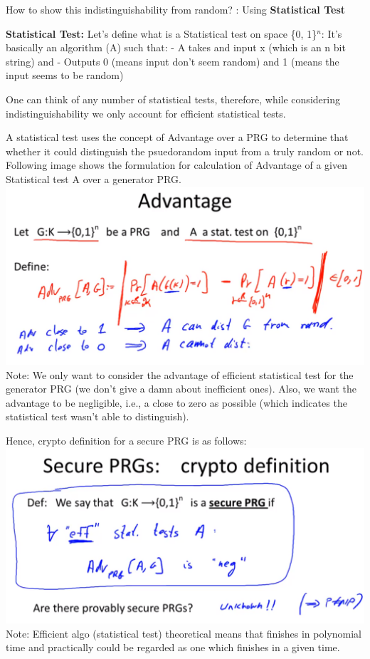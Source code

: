\documentclass[11pt]{article}
\makeatletter
\def\maxwidth{\ifdim\Gin@nat@width>\linewidth\linewidth
    \else\Gin@nat@width\fi}
\let\Oldincludegraphics\includegraphics
\renewcommand{\includegraphics}[1]{\Oldincludegraphics[width=.8\maxwidth]{#1}}
\makeatother
\begin{document}
How to show this indistinguishability from random? : Using
\textbf{Statistical Test}

\textbf{Statistical Test:} Let's define what is a Statistical test on
space \{0, 1\}\(^{n}\): It's basically an algorithm (A) such that: - A
takes and input x (which is an n bit string) and - Outputs 0 (means
input don't seem random) and 1 (means the input seems to be random)

One can think of any number of statistical tests, therefore, while
considering indistinguishability we only account for efficient
statistical tests.

A statistical test uses the concept of Advantage over a PRG to determine
that whether it could distinguish the psuedorandom input from a truly
random or not. Following image shows the formulation for calculation of
Advantage of a given Statistical test A over a generator PRG.
\includegraphics{./Images/Advantage-ST.png} Note: We only want to
consider the advantage of efficient statistical test for the generator
PRG (we don't give a damn about inefficient ones). Also, we want the
advantage to be negligible, i.e., a close to zero as possible (which
indicates the statistical test wasn't able to distinguish).

Hence, crypto definition for a secure PRG is as follows:
\includegraphics{./Images/SecurePRGs.png} Note: Efficient algo
(statistical test) theoretical means that finishes in polynomial time
and practically could be regarded as one which finishes in a given time.
\end{document}

